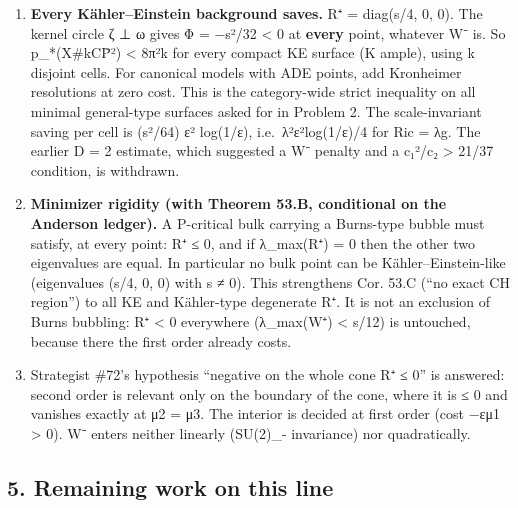 \documentclass[
  10pt,
]{report}
\providecommand{\tightlist}{%
  \setlength{\itemsep}{0pt}\setlength{\parskip}{0pt}}
\begin{document}
\begin{enumerate}
\def\labelenumi{\arabic{enumi}.}
\tightlist
\item
  \textbf{Every Kähler--Einstein background saves.} R⁺ = diag(s/4, 0,
  0). The kernel circle ζ ⊥ ω gives Φ = −s²/32 \textless{} 0 at
  \textbf{every} point, whatever W⁻ is. So p\_*(X\#kCP̄²) \textless{}
  8π²k for every compact KE surface (K ample), using k disjoint cells.
  For canonical models with ADE points, add Kronheimer resolutions at
  zero cost. This is the category-wide strict inequality on all minimal
  general-type surfaces asked for in Problem 2. The scale-invariant
  saving per cell is (s²/64) ε² log(1/ε), i.e.~λ²ε²log(1/ε)/4 for Ric =
  λg. The earlier D = 2 estimate, which suggested a W⁻ penalty and a
  c₁²/c₂ \textgreater{} 21/37 condition, is withdrawn.
\item
  \textbf{Minimizer rigidity (with Theorem 53.B, conditional on the
  Anderson ledger).} A P-critical bulk carrying a Burns-type bubble must
  satisfy, at every point: R⁺ ≤ 0, and if λ\_max(R⁺) = 0 then the other
  two eigenvalues are equal. In particular no bulk point can be
  Kähler--Einstein-like (eigenvalues (s/4, 0, 0) with s ≠ 0). This
  strengthens Cor. 53.C (``no exact CH region'') to all KE and
  Kähler-type degenerate R⁺. It is not an exclusion of Burns bubbling:
  R⁺ \textless{} 0 everywhere (λ\_max(W⁺) \textless{}
  \textbar s\textbar/12) is untouched, because there the first order
  already costs.
\item
  Strategist \#72's hypothesis ``negative on the whole cone R⁺ ≤ 0'' is
  answered: second order is relevant only on the boundary of the cone,
  where it is ≤ 0 and vanishes exactly at μ2 = μ3. The interior is
  decided at first order (cost −εμ1 \textgreater{} 0). W⁻ enters neither
  linearly (SU(2)\_- invariance) nor quadratically.
\end{enumerate}

\hypertarget{remaining-work-on-this-line}{%
\subsection{5. Remaining work on this
line}\label{remaining-work-on-this-line}}
\end{document}
